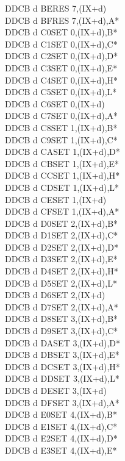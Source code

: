 \documentclass[oneside,a4paper]{book}
\begin{document}
\begin{multicols}{3}
{\begin{tabbing}
DDCB d BE\>RES 7,(IX+d)\\
DDCB d BF\>RES 7,(IX+d),A*\\
DDCB d C0\>SET 0,(IX+d),B*\\
DDCB d C1\>SET 0,(IX+d),C*\\
DDCB d C2\>SET 0,(IX+d),D*\\
DDCB d C3\>SET 0,(IX+d),E*\\
DDCB d C4\>SET 0,(IX+d),H*\\
DDCB d C5\>SET 0,(IX+d),L*\\
DDCB d C6\>SET 0,(IX+d)\\
DDCB d C7\>SET 0,(IX+d),A*\\
DDCB d C8\>SET 1,(IX+d),B*\\
DDCB d C9\>SET 1,(IX+d),C*\\
DDCB d CA\>SET 1,(IX+d),D*\\
DDCB d CB\>SET 1,(IX+d),E*\\
DDCB d CC\>SET 1,(IX+d),H*\\
DDCB d CD\>SET 1,(IX+d),L*\\
DDCB d CE\>SET 1,(IX+d)\\
DDCB d CF\>SET 1,(IX+d),A*\\
DDCB d D0\>SET 2,(IX+d),B*\\
DDCB d D1\>SET 2,(IX+d),C*\\
DDCB d D2\>SET 2,(IX+d),D*\\
DDCB d D3\>SET 2,(IX+d),E*\\
DDCB d D4\>SET 2,(IX+d),H*\\
DDCB d D5\>SET 2,(IX+d),L*\\
DDCB d D6\>SET 2,(IX+d)\\
DDCB d D7\>SET 2,(IX+d),A*\\
DDCB d D8\>SET 3,(IX+d),B*\\
DDCB d D9\>SET 3,(IX+d),C*\\
DDCB d DA\>SET 3,(IX+d),D*\\
DDCB d DB\>SET 3,(IX+d),E*\\
DDCB d DC\>SET 3,(IX+d),H*\\
DDCB d DD\>SET 3,(IX+d),L*\\
DDCB d DE\>SET 3,(IX+d)\\
DDCB d DF\>SET 3,(IX+d),A*\\
DDCB d E0\>SET 4,(IX+d),B*\\
DDCB d E1\>SET 4,(IX+d),C*\\
DDCB d E2\>SET 4,(IX+d),D*\\
DDCB d E3\>SET 4,(IX+d),E*\\

\end{tabbing}}
\end{multicols}
\end{document}
